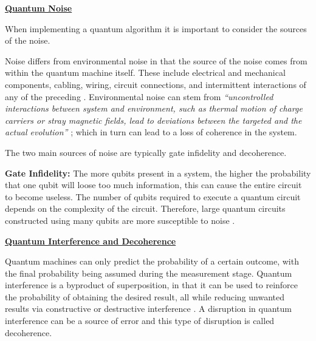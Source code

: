 
\vspace{0.4cm}
\textbf{\underline{Quantum Noise}}

When implementing a quantum algorithm it is important to consider the sources of the noise. %

Noise differs from environmental noise in that the source of the noise comes from within the quantum machine itself. These include electrical and mechanical components, cabling, wiring, circuit connections, and intermittent interactions of any of the preceding \citep{ERNIStar}. Environmental noise can stem from \emph{``uncontrolled interactions between system and environment, such as thermal motion of charge carriers or stray magnetic fields, lead to deviations between the targeted and the actual evolution''} \citep{QEnviron}; which in turn can lead to a loss of coherence in the system. 

The two main sources of noise are typically gate infidelity and decoherence. 

\textbf{Gate Infidelity:} The more qubits present in a system, the higher the probability that one qubit will loose too much information, this can cause the entire circuit to become useless. The number of qubits required to execute a quantum circuit depends on the complexity of the circuit. Therefore, large quantum circuits constructed using many qubits are more susceptible to noise \citep{INGKOK}.


\vspace{0.4cm}
\textbf{\underline{Quantum Interference and Decoherence}}

Quantum machines can only predict the probability of a certain outcome, with the final probability being assumed during the measurement stage.
Quantum interference is a byproduct of superposition, in that it can be used to reinforce the probability of obtaining the desired result, all while reducing unwanted results via constructive or destructive interference \citep{INGKOK}. A disruption in quantum interference can be a source of error and this type of disruption is called decoherence.


